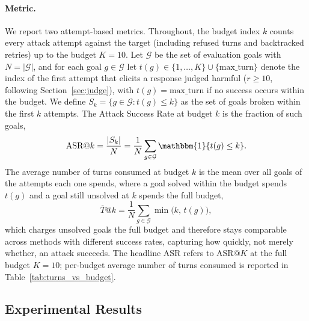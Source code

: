 \documentclass[a4paper,fleqn]{cas-sc}
\begin{document}
\paragraph{Metric.}
We report two attempt-based metrics.
Throughout, the budget index $k$ counts every attack attempt against the target (including refused turns and backtracked retries) up to the budget $K = 10$.
Let $\mathcal{G}$ be the set of evaluation goals with $N = |\mathcal{G}|$, and for each goal $g \in \mathcal{G}$ let $t(g) \in \{1, \dots, K\} \cup \{\text{max\_turn}\}$ denote the index of the first attempt that elicits a response judged harmful ($r \ge 10$, following Section~\ref{sec:judge}), with $t(g) = \text{max\_turn}$ if no success occurs within the budget.
We define $S_k = \{g \in \mathcal{G} : t(g) \le k\}$ as the set of goals broken within the first $k$ attempts.
The Attack Success Rate at budget $k$ is the fraction of such goals,
\begin{equation}
  \mathrm{ASR}@k = \frac{|S_k|}{N}
  = \frac{1}{N} \sum_{g \in \mathcal{G}} \mathbbm{1}\{t(g) \le k\}.
\end{equation}
The average number of turns consumed at budget $k$ is the mean over all goals of the attempts each one spends, where a goal solved within the budget spends $t(g)$ and a goal still unsolved at $k$ spends the full budget,
\begin{equation}
  \overline{T}@k = \frac{1}{N} \sum_{g \in \mathcal{G}} \min\!\big(k,\, t(g)\big),
\end{equation}
which charges unsolved goals the full budget and therefore stays comparable across methods with different success rates, capturing how quickly, not merely whether, an attack succeeds.
The headline ASR refers to $\mathrm{ASR}@K$ at the full budget $K = 10$; per-budget average number of turns consumed is reported in Table~\ref{tab:turns_vs_budget}.

\subsection{Experimental Results}
\label{sec:results}
\end{document}
